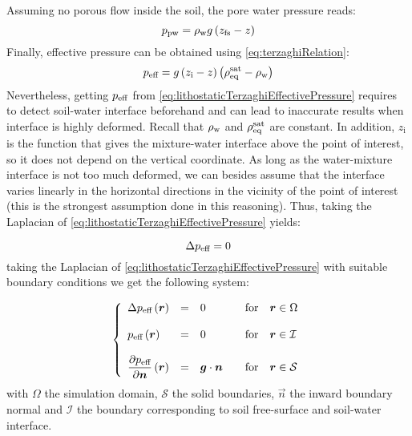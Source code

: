 \documentclass{../GPUSPHtemplate}
\begin{document}
Assuming no porous flow inside the soil, the pore water pressure reads:
 \begin{equation}
p_{\text{pw}} = \rho_{\text{w}} g \left( z_{\text{fs}} -  z \right)
\label{eq:poreWaterPressure}
 \end{equation}
%
Finally, effective pressure can be obtained using \eqref{eq:terzaghiRelation}:
%
\begin{equation}
p_{\text{eff}} = g \left(z_{\text{i}} - z \right)\left(\rho_{\text{eq}}^{\text{sat}} - \rho_{\text{w}} \right)
\label{eq:lithostaticTerzaghiEffectivePressure}
\end{equation}
%
Nevertheless, getting $p_{\text{eff}}$ from \eqref{eq:lithostaticTerzaghiEffectivePressure} requires to detect soil-water interface beforehand and can lead to inaccurate results when interface is highly deformed. Recall that $\rho_{\text{w}}$ and $\rho_{\text{eq}}^{\text{sat}}$ are constant. In addition, $z_{\text{i}}$ is the function that gives the mixture-water interface above the point of interest, so it does not depend on the vertical coordinate. As long as the water-mixture interface is not too much deformed, we can besides assume that the interface varies linearly in the horizontal directions in the vicinity of the point of interest (this is the strongest assumption done in this reasoning). Thus, taking the Laplacian of \eqref{eq:lithostaticTerzaghiEffectivePressure} yields:

\begin{equation}
\Delta p_{\text{eff}} = 0
\label{eq:effectivePressureLaplaceEquation}
\end{equation}
taking the Laplacian of \eqref{eq:lithostaticTerzaghiEffectivePressure} with suitable boundary conditions we get the following system:


%
\begin{equation}
\left\lbrace
\begin{array}{llll}
\Delta p_{\text{eff}} \left( \bm{r} \right) & = & 0 & \quad \text{for} \quad \bm{r} \in \Omega\\
&&&\\
p_{\text{eff}} \left( \bm{r} \right) & = & 0 & \quad \text{for} \quad \bm{r} \in \mathcal{I}\\
&&&\\
 \dfrac{\partial  p_{\text{eff}}}{\partial \bm{n}} \left( \bm{r} \right) & = & \bm{g} \cdot \bm{n} & \quad \text{for} \quad \bm{r}\in \mathcal{S} \\
\end{array}
\right.
\label{eq:effetivePressureSystem}
\end{equation}
%
with $\Omega$ the simulation domain, $\mathcal{S}$ the solid boundaries, $\vec{n}$ the inward boundary normal and $\mathcal{I}$ the boundary corresponding to soil free-surface and soil-water interface. 
\end{document}
